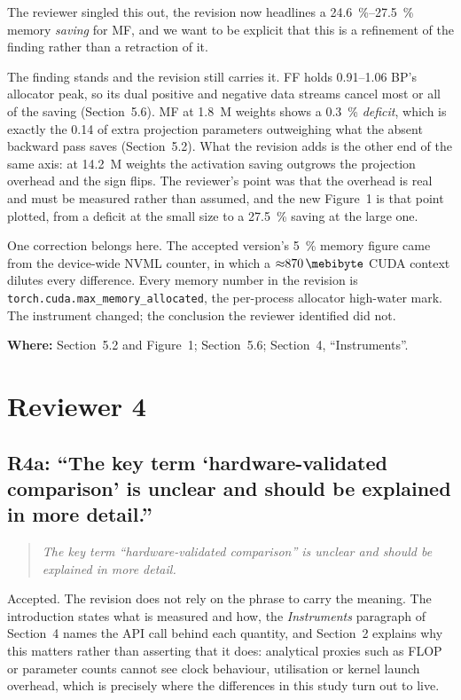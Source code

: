 \documentclass[11pt,a4paper]{article}
\newcommand{\tmma}{\texttt{torch.cuda.\allowbreak max\_memory\_\allowbreak allocated}}
\newcommand{\FF}{FF}
\newcommand{\MF}{MF}
\newcommand{\BP}{BP}
\newenvironment{comment}%
  {\begin{quote}\itshape\small}%
  {\end{quote}}
\newcommand{\where}[1]{\par\smallskip\noindent\textbf{Where:} #1\par}
\begin{document}
\noindent
The reviewer singled this out, the revision now headlines a
\SIrange{24.6}{27.5}{\percent} memory \emph{saving} for \MF{}, and we want to
be explicit that this is a refinement of the finding rather than a retraction
of it.

The finding stands and the revision still carries it. \FF{} holds
\SIrange{0.91}{1.06}{\times} \BP{}'s allocator peak, so its dual positive and negative data
streams cancel most or all of the saving (Section~5.6). \MF{} at
\num{1.8}~M weights shows a \SI{0.3}{\percent} \emph{deficit}, which is
exactly the \SI{0.14}{\mebibyte} of extra projection parameters outweighing
what the absent backward pass saves (Section~5.2). What the revision adds is
the other end of the same axis: at \num{14.2}~M weights the activation saving
outgrows the projection overhead and the sign flips. The reviewer's point was
that the overhead is real and must be measured rather than assumed, and the
new Figure~1 is that point plotted, from a deficit at the small size to a
\SI{27.5}{\percent} saving at the large one.

One correction belongs here. The accepted version's \SI{5}{\percent} memory
figure came from the device-wide NVML counter, in which a
${\approx}\SI{870}{\mebibyte}$ CUDA context dilutes every difference. Every
memory number in the revision is \tmma{}, the per-process allocator
high-water mark. The instrument changed; the conclusion the reviewer
identified did not.

\where{Section~5.2 and Figure~1; Section~5.6; Section~4, ``Instruments''.}

\section*{Reviewer 4}

\subsection*{R4a: ``The key term `hardware-validated comparison' is unclear
and should be explained in more detail.''}

\begin{comment}
The key term ``hardware-validated comparison'' is unclear and should be
explained in more detail.
\end{comment}

\noindent
Accepted. The revision does not rely on the phrase to carry the meaning. The
introduction states what is measured and how, the \emph{Instruments} paragraph
of Section~4 names the API call behind each quantity, and Section~2 explains
why this matters rather than asserting that it does: analytical proxies such
as FLOP or parameter counts cannot see clock behaviour, utilisation or kernel
launch overhead, which is precisely where the differences in this study turn
out to live.
\end{document}
